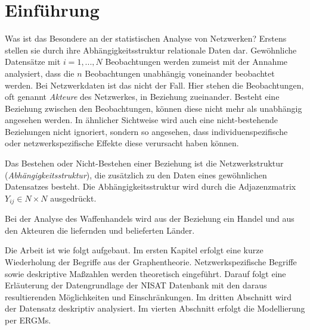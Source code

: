 \documentclass[a4paper,ngerman,oneside,titlepage,bibliography=totoc,11pt]{scrreprt}
\begin{document}
\begin{abstract}


\begin{center}
{\it \bf Abstract} 
\end{center}

hier kommt noch das abstract rein
 


\end{abstract}




\tableofcontents




\chapter{Einführung}

Was ist das Besondere an der statistischen Analyse von Netzwerken? Erstens stellen sie durch ihre Abhängigkeitsstruktur relationale Daten dar. Gewöhnliche Datensätze mit $i = 1, ..., N$ Beobachtungen werden zumeist mit der Annahme analysiert, dass die $n$ Beobachtungen unabhängig voneinander beobachtet werden. Bei Netzwerkdaten ist das nicht der Fall. Hier stehen die Beobachtungen, oft genannt \emph{Akteure} des Netzwerkes, in Beziehung zueinander. Besteht eine Beziehung zwischen den Beobachtungen, können diese nicht mehr als unabhängig angesehen werden. In ähnlicher Sichtweise wird auch eine nicht-bestehende Beziehungen nicht ignoriert, sondern so angesehen, dass individuenspezifische oder netzwerkspezifische Effekte diese verursacht haben können.

Das Bestehen oder Nicht-Bestehen einer Beziehung ist die Netzwerkstruktur (\emph{Abhängigkeitsstruktur}), die zusätzlich zu den Daten eines gewöhnlichen Datensatzes besteht. Die Abhängigkeitsstruktur wird durch die Adjazenzmatrix $Y_{ij} \in N \times N$ ausgedrückt.

Bei der Analyse des Waffenhandels wird aus der Beziehung ein Handel und aus den Akteuren die liefernden und belieferten Länder.

Die Arbeit ist wie folgt aufgebaut. Im ersten Kapitel erfolgt eine kurze Wiederholung der Begriffe aus der Graphentheorie. Netzwerkspezifische Begriffe sowie deskriptive Maßzahlen werden theoretisch eingeführt. Darauf folgt eine Erläuterung der Datengrundlage der NISAT Datenbank mit den daraus resultierenden Möglichkeiten und Einschränkungen. Im dritten Abschnitt wird der Datensatz deskriptiv analysiert. Im vierten Abschnitt erfolgt die Modellierung per ERGMs.
\end{document}
